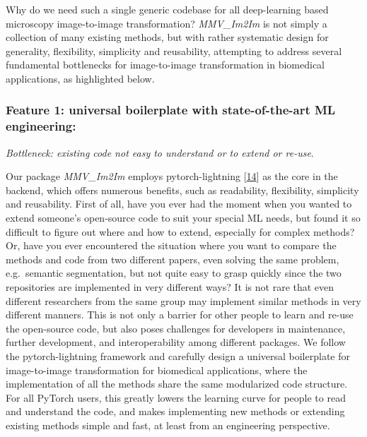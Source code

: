 Why do we need such a single generic codebase for all deep-learning based microscopy image-to-image transformation? \emph{MMV\_Im2Im} is not simply a collection of many existing methods, but with rather systematic design for generality, flexibility, simplicity and reusability, attempting to address several fundamental bottlenecks for image-to-image transformation in biomedical applications, as highlighted below.

\hypertarget{feature-1-universal-boilerplate-with-state-of-the-art-ml-engineering}{%
\subsubsection{Feature 1: universal boilerplate with state-of-the-art ML engineering:}\label{feature-1-universal-boilerplate-with-state-of-the-art-ml-engineering}}

\emph{Bottleneck: existing code not easy to understand or to extend or re-use}.

Our package \emph{MMV\_Im2Im} employs pytorch-lightning {[}\protect\hyperlink{ref-YbvSvdyB}{14}{]} as the core in the backend, which offers numerous benefits, such as readability, flexibility, simplicity and reusability. First of all, have you ever had the moment when you wanted to extend someone's open-source code to suit your special ML needs, but found it so difficult to figure out where and how to extend, especially for complex methods? Or, have you ever encountered the situation where you want to compare the methods and code from two different papers, even solving the same problem, e.g.~semantic segmentation, but not quite easy to grasp quickly since the two repositories are implemented in very different ways? It is not rare that even different researchers from the same group may implement similar methods in very different manners. This is not only a barrier for other people to learn and re-use the open-source code, but also poses challenges for developers in maintenance, further development, and interoperability among different packages.
We follow the pytorch-lightning framework and carefully design a universal boilerplate for image-to-image transformation for biomedical applications, where the implementation of all the methods share the same modularized code structure. For all PyTorch users, this greatly lowers the learning curve for people to read and understand the code, and makes implementing new methods or extending existing methods simple and fast, at least from an engineering perspective.

